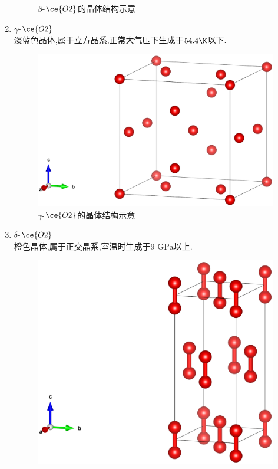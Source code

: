 \documentclass{ctexart}
\begin{document}
\begin{enumerate}[label=\tbf{\arabic*},topsep=0pt,parsep=0pt,itemsep=0pt,partopsep=0pt]
\begin{figure}[H]
            \caption{$\beta$-$\ce{O2}$的晶体结构示意}
        \end{figure}
    \item $\gamma$-$\ce{O2}$\\
        \indent 淡蓝色晶体,属于立方晶系,正常大气压下生成于$54.4\K$以下.
        \begin{figure}[H]
            \centering\includegraphics[scale=0.125]{picture/gamma-O2.eps}
            \caption{$\gamma$-$\ce{O2}$的晶体结构示意}
        \end{figure}
    \item $\delta$-$\ce{O2}$\\
        \indent 橙色晶体,属于正交晶系,室温时生成于$9\text{ GPa}$以上.
        \begin{figure}[H]
            \centering\includegraphics[scale=0.125]{picture/delta-O2.eps}

\end{figure}
\end{enumerate}
\end{document}
